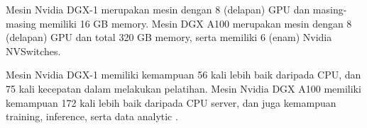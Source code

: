Mesin Nvidia DGX-1 merupakan mesin dengan 8 (delapan) GPU dan masing-masing memiliki 16 GB memory. Mesin DGX A100 merupakan mesin dengan 8 (delapan) GPU dan total 320 GB memory, serta memiliki 6 (enam) Nvidia NVSwitches.

Mesin Nvidia DGX-1 memiliki kemampuan 56 kali lebih baik daripada CPU, dan 75 kali kecepatan dalam melakukan pelatihan. Mesin Nvidia DGX A100 memiliki kemampuan 172 kali lebih baik daripada CPU server, dan juga kemampuan training, inference, serta data analytic \cite{HPCGunadarma}.






